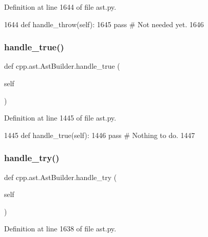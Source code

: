 Definition at line 1644 of file ast.\+py.


\begin{DoxyCode}
1644     \textcolor{keyword}{def }handle\_throw(self):
1645         \textcolor{keywordflow}{pass}  \textcolor{comment}{# Not needed yet.}
1646 
\end{DoxyCode}
\mbox{\label{classcpp_1_1ast_1_1AstBuilder_ad480255644817388b81b05acc4aa9c9a}} 
\subsubsection{\texorpdfstring{handle\+\_\+true()}{handle\_true()}}
{\footnotesize\ttfamily def cpp.\+ast.\+Ast\+Builder.\+handle\+\_\+true (\begin{DoxyParamCaption}\item[{}]{self }\end{DoxyParamCaption})}



Definition at line 1445 of file ast.\+py.


\begin{DoxyCode}
1445     \textcolor{keyword}{def }handle\_true(self):
1446         \textcolor{keywordflow}{pass}  \textcolor{comment}{# Nothing to do.}
1447 
\end{DoxyCode}
\mbox{\label{classcpp_1_1ast_1_1AstBuilder_a6c7998f3fdcd046718ff809dbe257645}} 
\subsubsection{\texorpdfstring{handle\+\_\+try()}{handle\_try()}}
{\footnotesize\ttfamily def cpp.\+ast.\+Ast\+Builder.\+handle\+\_\+try (\begin{DoxyParamCaption}\item[{}]{self }\end{DoxyParamCaption})}



Definition at line 1638 of file ast.\+py.


